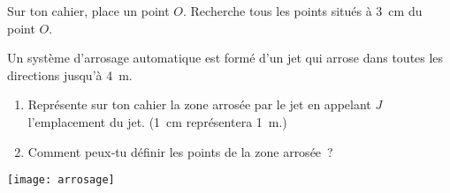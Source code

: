 
\begin{activite}

 \begin{partie}
 Sur ton cahier, place un point $O$. Recherche tous les points situés à 3 cm du point $O$. 
  \end{partie}

 \begin{partie}
 \begin{minipage}[c]{0.78\linewidth}
 Un système d'arrosage automatique est formé d'un jet qui arrose dans toutes les directions jusqu'à 4 m.
  \begin {enumerate}
  \item Représente sur ton cahier la zone arrosée par le jet en appelant $J$ l'emplacement du jet. (1 cm représentera 1 m.)
  \item Comment peux‑tu définir les points de la zone arrosée ? 
  \end{enumerate} 
  \end{minipage} \hfill %
 \begin{minipage}[c]{0.16\linewidth}
 \texttt{[image: arrosage]}
  \end{minipage} \\
    
  \end{partie}

\end{activite}


